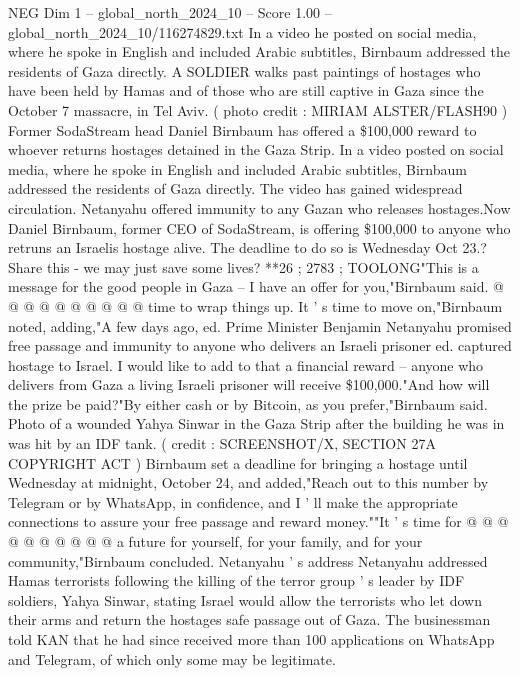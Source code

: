 \begin{textsample}{NEG Dim 1 – global\_north\_2024\_10 – Score 1.00 – global\_north\_2024\_10/116274829.txt}  \label{ex:f1_neg_077}
In a video he posted on social media, where he spoke in English and included Arabic subtitles, Birnbaum addressed the residents of Gaza directly.
A SOLDIER walks past paintings of hostages who have been held by Hamas and of those who are still captive in Gaza since the October 7 massacre, in Tel Aviv. ( photo credit : MIRIAM ALSTER/FLASH90 ) Former SodaStream head Daniel Birnbaum has offered a \$100,000 reward to whoever returns hostages detained in the Gaza Strip.
In a video posted on social media, where he spoke in English and included Arabic subtitles, Birnbaum addressed the residents of Gaza directly.
The video has gained widespread circulation.
Netanyahu offered immunity to any Gazan who releases hostages.Now Daniel Birnbaum, former CEO of SodaStream, is offering \$100,000 to anyone who retruns an Israelis hostage alive.
The deadline to do so is Wednesday Oct 23.?
Share this - we may just save some lives? **26 ; 2783 ; TOOLONG"This is a message for the good people in Gaza -- I have an offer for you,"Birnbaum said. @ @ @ @ @ @ @ @ @ @ time to wrap things up.
It ' s time to move on,"Birnbaum noted, adding,"A few days ago, ed.
Prime Minister Benjamin Netanyahu promised free passage and immunity to anyone who delivers an Israeli prisoner ed. captured hostage to Israel.
I would like to add to that a financial reward -- anyone who delivers from Gaza a living Israeli prisoner will receive \$100,000."And how will the prize be paid?"By either cash or by Bitcoin, as you prefer,"Birnbaum said.
Photo of a wounded Yahya Sinwar in the Gaza Strip after the building he was in was hit by an IDF tank. ( credit : SCREENSHOT/X, SECTION 27A COPYRIGHT ACT ) Birnbaum set a deadline for bringing a hostage until Wednesday at midnight, October 24, and added,"Reach out to this number by Telegram or by WhatsApp, in confidence, and I ' ll make the appropriate connections to assure your free passage and reward money.""It ' s time for @ @ @ @ @ @ @ @ @ @ a future for yourself, for your family, and for your community,"Birnbaum concluded.
Netanyahu ' s address Netanyahu addressed Hamas terrorists following the killing of the terror group ' s leader by IDF soldiers, Yahya Sinwar, stating Israel would allow the terrorists who let down their arms and return the hostages safe passage out of Gaza.
The businessman told KAN that he had since received more than 100 applications on WhatsApp and Telegram, of which only some may be legitimate.

\end{textsample}
